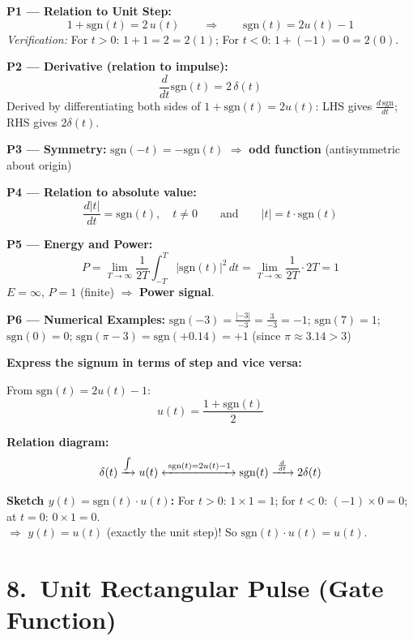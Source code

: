 \documentclass[10pt,a4paper]{article}
\begin{document}
\begin{propbox}
\textbf{P1 --- Relation to Unit Step:}
\[
  1 + \text{sgn}(t) = 2\,u(t) \qquad\Rightarrow\qquad \boxed{\text{sgn}(t) = 2u(t)-1}
\]
\textit{Verification:} For $t>0$: $1+1=2=2(1)$\checkmark; For $t<0$: $1+(-1)=0=2(0)$\checkmark.

\medskip
\textbf{P2 --- Derivative (relation to impulse):}
\[
  \frac{d}{dt}\text{sgn}(t) = 2\,\delta(t)
\]
Derived by differentiating both sides of $1+\text{sgn}(t)=2u(t)$:
LHS gives $\tfrac{d\,\text{sgn}}{dt}$; RHS gives $2\delta(t)$.

\medskip
\textbf{P3 --- Symmetry:}
$\text{sgn}(-t) = -\text{sgn}(t)$ $\Rightarrow$ \textbf{odd function} (antisymmetric about origin)

\medskip
\textbf{P4 --- Relation to absolute value:}
\[
  \frac{d|t|}{dt} = \text{sgn}(t), \quad t\neq0 \qquad\text{and}\qquad |t| = t\cdot\text{sgn}(t)
\]

\medskip
\textbf{P5 --- Energy and Power:}
\[
  P = \lim_{T\to\infty}\frac{1}{2T}\int_{-T}^{T}|\text{sgn}(t)|^2\,dt = \lim_{T\to\infty}\frac{1}{2T}\cdot 2T = 1
\]
$E=\infty$, $P=1$ (finite) $\Rightarrow$ \textbf{Power signal}.

\medskip
\textbf{P6 --- Numerical Examples:}
$\text{sgn}(-3) = \tfrac{|-3|}{-3} = \tfrac{3}{-3} = -1$; \quad
$\text{sgn}(7) = 1$; \quad
$\text{sgn}(0) = 0$; \quad
$\text{sgn}(\pi-3) = \text{sgn}(+0.14) = +1$ (since $\pi\approx3.14>3$)
\end{propbox}

\begin{exbox}
\textbf{Express the signum in terms of step and vice versa:}

From $\text{sgn}(t)=2u(t)-1$:
\[
  u(t) = \frac{1+\text{sgn}(t)}{2}
\]

\textbf{Relation diagram:}
\[
  \delta(t)\xrightarrow{\int} u(t)\xleftrightarrow{\;\text{sgn}(t)=2u(t)-1\;}\text{sgn}(t)\xrightarrow{\;\frac{d}{dt}\;} 2\delta(t)
\]

\textbf{Sketch $y(t) = \text{sgn}(t)\cdot u(t)$:}
For $t>0$: $1\times1=1$; for $t<0$: $(-1)\times 0=0$; at $t=0$: $0\times1=0$.\\
$\Rightarrow$ $y(t)=u(t)$ (exactly the unit step)! So $\text{sgn}(t)\cdot u(t)=u(t)$.
\end{exbox}

\section{8.\ Unit Rectangular Pulse (Gate Function)}
\end{document}
